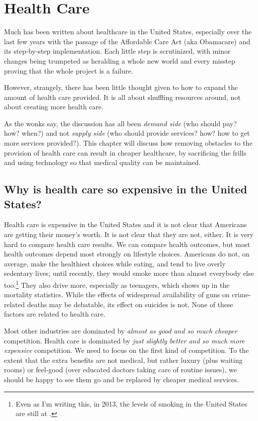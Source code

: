 \chapter{Health Care}
\label{chpt:health}

Much has been written about healthcare in the United States, especially over
the last few years with the passage of the Affordable Care Act (aka Obamacare)
and its step-by-step implementation. Each little step is scrutinized, with
minor changes being trumpeted as heralding a whole new world and every misstep
proving that the whole project is a failure.

However, strangely, there has been little thought given to how to expand the
amount of health care provided. It is all about shuffling resources around, not
about creating more health care.

As the wonks say, the discussion has all been \emph{demand side} (who should
pay? how? when?) and not \emph{supply side} (who should provide services? how?
how to get more services provided?). This chapter will discuss how removing
obstacles to the provision of health care can result in cheaper healthcare, by
sacrificing the frills and using technology so that medical quality can be
maintained.

\section{Why is health care so expensive in the United States?}

Health care is expensive in the United States and it is not clear that
Americans are getting their money's worth. It is not clear that they are not,
either. It is very hard to compare health care results. We can compare health
outcomes, but most health outcomes depend most strongly on lifestyle choices.
Americans do not, on average, make the healthiest choices while eating, and
tend to live overly sedentary lives; until recently, they would smoke more than
almost everybody else too.\footnote{Even as I'm writing this, in 2013, the
levels of smoking in the United States are still at \FIXME.} They also drive
more, especially as teenagers, which shows up in the mortality statistics.
While the effects of widespread availability of guns on crime-related deaths
may be debatable, its effect on suicides is not. None of these factors are
related to health care.

Most other industries are dominated by \emph{almost as good and so much
cheaper} competition. Health care is dominated by \emph{just slightly better
and so much more expensive} competition. We need to focus on the first kind of
competition. To the extent that the extra benefits are not medical, but rather
luxury (plus waiting rooms) or feel-good (over educated doctors taking care of
routine issues), we should be happy to see them go and be replaced by cheaper
medical services.


